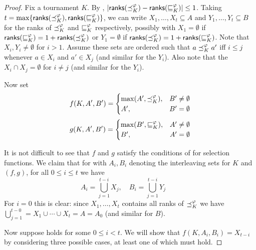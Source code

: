 \begin{proof}
    Fix a tournament $K$. By ,
    $|\mathsf{ranks}({{\preceq_K^\varphi}}) - \mathsf{ranks}({{\sqsubseteq_K^\varphi}})| \le 1$. Taking $t =
    \max\{\mathsf{ranks}({{\preceq_K^\varphi}}), \mathsf{ranks}({{\sqsubseteq_K^\varphi}})\}$, we can write $X_1,
    \ldots, X_t \subseteq A$ and $Y_1, \ldots, Y_t \subseteq B$ for the ranks
    of ${\preceq_K^\varphi}$ and ${\sqsubseteq_K^\varphi}$ respectively, possibly with $X_1 =
    \emptyset$ if $\mathsf{ranks}({{\sqsubseteq_K^\varphi}}) = 1 + \mathsf{ranks}({{\preceq_K^\varphi}})$ or $Y_1 =
    \emptyset$ if $\mathsf{ranks}({{\preceq_K^\varphi}}) = 1 + \mathsf{ranks}({{\sqsubseteq_K^\varphi}})$. Note
    that $X_i, Y_i \ne \emptyset$ for $i > 1$. Assume these sets are ordered
    such that $a \preceq_K^\varphi a'$ iff $i \le j$ whenever $a \in X_i$ and $a' \in
    X_j$ (and similar for the $Y_i$). Also note that the $X_i \cap X_j =
    \emptyset$ for $i \ne j$ (and similar for the $Y_i$).

    Now set \footnotemark{}
    \[
        f(K, A', B') = \begin{cases}
           \max(A', {\preceq_K^\varphi}),& B' \ne \emptyset \\
           A',& B' = \emptyset
        \end{cases}
    \]
    \[
        g(K, A', B') = \begin{cases}
            \max(B', {\sqsubseteq_K^\varphi}),& A' \ne \emptyset \\
            B',& A' = \emptyset
        \end{cases}
    \]


    It is not difficult to see that $f$ and $g$ satisfy the conditions of
     for selection functions. We claim that for
    with $A_i, B_i$ denoting the interleaving sets for $K$ and $(f, g)$, for
    all $0 \le i \le t$ we have
    \begin{equation}
        \label{tourn_eqn_ai_bi_unions}
        A_i = \bigcup_{j=1}^{t - i}{X_j},
        \quad
        B_i = \bigcup_{j=1}^{t - i}{Y_j}
        \quad
        \quad
    \end{equation}
    For $i = 0$ this is clear: since $X_1,\ldots,X_t$ contains all ranks of
    ${\preceq_K^\varphi}$ we have $\bigcup_{j=1}^{t-0} = X_1 \cup \cdots \cup X_t = A
    = A_0$ (and similar for $B$).

    Now suppose  holds for some $0 \le i < t$. We
    will show that $f(K, A_i, B_i) = X_{t-i}$ by considering three possible
    cases, at least one of which must hold.


\end{proof}
